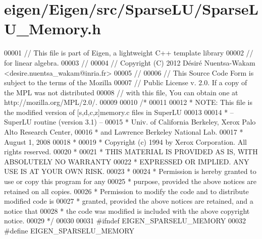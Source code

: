\hypertarget{eigen_2_eigen_2src_2_sparse_l_u_2_sparse_l_u___memory_8h_source}{}\section{eigen/\+Eigen/src/\+Sparse\+L\+U/\+Sparse\+L\+U\+\_\+\+Memory.h}
\label{eigen_2_eigen_2src_2_sparse_l_u_2_sparse_l_u___memory_8h_source}

\begin{DoxyCode}
00001 \textcolor{comment}{// This file is part of Eigen, a lightweight C++ template library}
00002 \textcolor{comment}{// for linear algebra.}
00003 \textcolor{comment}{//}
00004 \textcolor{comment}{// Copyright (C) 2012 Désiré Nuentsa-Wakam <desire.nuentsa\_wakam@inria.fr>}
00005 \textcolor{comment}{//}
00006 \textcolor{comment}{// This Source Code Form is subject to the terms of the Mozilla}
00007 \textcolor{comment}{// Public License v. 2.0. If a copy of the MPL was not distributed}
00008 \textcolor{comment}{// with this file, You can obtain one at http://mozilla.org/MPL/2.0/.}
00009 
00010 \textcolor{comment}{/* }
00011 \textcolor{comment}{ }
00012 \textcolor{comment}{ * NOTE: This file is the modified version of [s,d,c,z]memory.c files in SuperLU }
00013 \textcolor{comment}{ }
00014 \textcolor{comment}{ * -- SuperLU routine (version 3.1) --}
00015 \textcolor{comment}{ * Univ. of California Berkeley, Xerox Palo Alto Research Center,}
00016 \textcolor{comment}{ * and Lawrence Berkeley National Lab.}
00017 \textcolor{comment}{ * August 1, 2008}
00018 \textcolor{comment}{ *}
00019 \textcolor{comment}{ * Copyright (c) 1994 by Xerox Corporation.  All rights reserved.}
00020 \textcolor{comment}{ *}
00021 \textcolor{comment}{ * THIS MATERIAL IS PROVIDED AS IS, WITH ABSOLUTELY NO WARRANTY}
00022 \textcolor{comment}{ * EXPRESSED OR IMPLIED.  ANY USE IS AT YOUR OWN RISK.}
00023 \textcolor{comment}{ *}
00024 \textcolor{comment}{ * Permission is hereby granted to use or copy this program for any}
00025 \textcolor{comment}{ * purpose, provided the above notices are retained on all copies.}
00026 \textcolor{comment}{ * Permission to modify the code and to distribute modified code is}
00027 \textcolor{comment}{ * granted, provided the above notices are retained, and a notice that}
00028 \textcolor{comment}{ * the code was modified is included with the above copyright notice.}
00029 \textcolor{comment}{ */}
00030 
00031 \textcolor{preprocessor}{#ifndef EIGEN\_SPARSELU\_MEMORY}
00032 \textcolor{preprocessor}{#define EIGEN\_SPARSELU\_MEMORY}

\end{DoxyCode}
